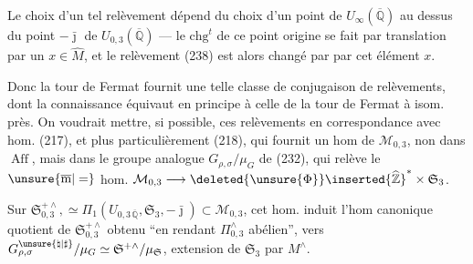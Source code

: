 Le choix d'un tel relèvement dépend du choix d'un point de
$U_\infty(\overline{\mathbb Q})$ au dessus du point $-\bar{\jmath}$
de $U_{0,3}(\overline{\mathbb Q})$ --- le $\mathrm{chg}^{t}$ de ce
point origine se fait par translation par un $x\in\widehat M$,
et le relèvement (238) est alors changé par 
par cet élément $x$.

Donc la tour de Fermat fournit une telle classe de conjugaison
de relèvements, dont la connaissance équivaut en principe
à celle de la tour de Fermat à isom. près. On voudrait mettre,
si possible, ces relèvements en correspondance avec
 hom. (217), et plus particulièrement
 (218), qui fournit un hom
 de $\mathcal M_{0,3}$, non dans
 $\operatorname{Aff}$, mais dans
le groupe analogue $G_{\rho,\sigma}/\mu_G$ de (232), qui relève
le $\unsure{\overline{\mathrm m}|=}$ hom.
$\mathcal M_{0,3}\longrightarrow
\deleted{\unsure{\Phi}}\inserted{\widehat{\mathbb Z}}^{*}\times\mathfrak S_3$.




Sur $\mathfrak S_{0,3}^{+\wedge},\simeq
\Pi_1(U_{0,3\,\overline{\mathbb Q}},\mathfrak S_3,-\bar{\jmath})
\subset\mathcal M_{0,3}$,
cet hom. induit l'hom canonique
 quotient de $\mathfrak S_{0,3}^{+\wedge}$
obtenu ``en rendant $\Pi_{0,3}^\wedge$ abélien'',
vers $G_{\rho,\sigma}^{\unsure{\natural|\sharp}}/\mu_G
\simeq\mathfrak S^{+\wedge}/\mu_{\mathfrak S}$, extension de
$\mathfrak S_3$
par $M^\wedge$.

